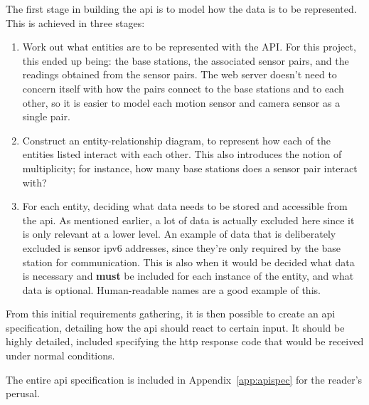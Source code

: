 The first stage in building the \acrshort{api} is to model how the data is to
be represented. This is achieved in three stages:

\begin{enumerate}
  \item Work out what entities are to be represented with the API. For this
  project, this ended up being: the base stations, the associated sensor
  pairs, and the readings obtained from the sensor pairs. The web server
  doesn't need to concern itself with how the pairs connect to the base
  stations and to each other, so it is easier to model each motion sensor and
  camera sensor as a single pair.
  \item Construct an entity-relationship diagram, to represent how each of
  the entities listed interact with each other. This also introduces the
  notion of multiplicity; for instance, how many base stations does a sensor
  pair interact with?
  \item For each entity, deciding what data needs to be stored and accessible
  from the \acrshort{api}. As mentioned earlier, a lot of data is actually
  excluded here since it is only relevant at a lower level. An example of
  data that is deliberately excluded is sensor \acrshort{ipv6} addresses,
  since they're only required by the base station for communication. This is
  also when it would be decided what data is necessary and \textbf{must} be
  included for each instance of the entity, and what data is optional.
  Human-readable names are a good example of this.
\end{enumerate}

From this initial requirements gathering, it is then possible to create an
\acrshort{api} specification, detailing how the \acrshort{api} should react
to certain input. It should be highly detailed, included specifying the
\acrshort{http} response code that would be received under normal conditions.

The entire \acrshort{api} specification is included in
Appendix~\ref{app:apispec} for the reader's perusal.